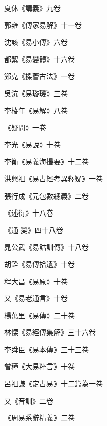 \begin{pinyinscope}
 夏休《講義》九卷



 郭雍《傳家易解》十一卷



 沈該《易小傳》六卷



 都絜《易變體》十六卷



 鄭克《揲蓍古法》一卷



 吳沆《易璇璣》三卷



 李椿年《易解》八卷



 《疑問》一卷



 李光《易說》十卷



 李衡《易義海撮要》十二卷



 洪興祖《易古經考異釋疑》一卷



 張行成《元包數總義》二卷



 《述衍》十八卷



 《通
 變》四十八卷



 晁公武《易詁訓傳》十八卷



 胡銓《易傳拾遺》十卷



 程大昌《易原》十卷



 又《易老通言》十卷



 楊萬里《易傳》二十卷



 林慄《易經傳集解》三十六卷



 李舜臣《易本傳》三十三卷



 曾穜《大易粹言》十卷



 呂祖謙《定古易》十二篇為一卷



 又《音訓》二卷



 《周易系辭精義》二卷




\end{pinyinscope}
